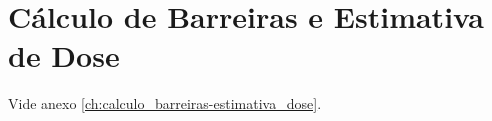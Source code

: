 \chapter{Cálculo de Barreiras e Estimativa de Dose}
Vide anexo \ref{ch:calculo_barreiras-estimativa_dose}.